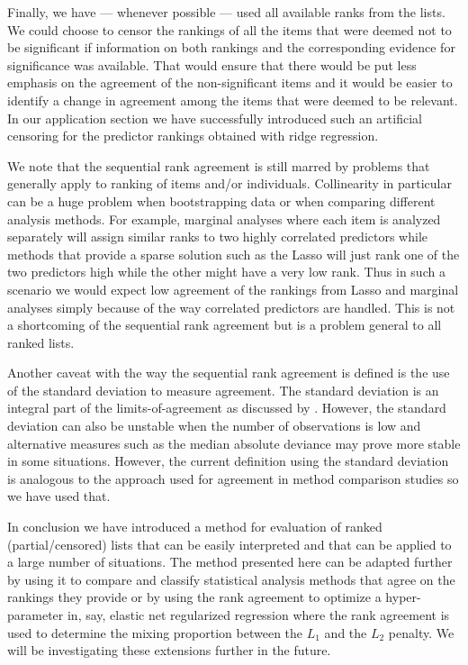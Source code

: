 \documentclass[12pt,a4paper]{article}
\theoremstyle{plain}
\begin{document}
Finally, we have --- whenever possible --- used all available ranks
from the lists.  We could choose to censor the rankings of all the
items that were deemed not to be significant if information on both
rankings and the corresponding evidence for significance was
available. That would ensure that there would be put less emphasis on
the agreement of the non-significant items and it would be easier to
identify a change in agreement among the items that were deemed to
be relevant. In our application section we have successfully introduced
such an artificial censoring for the predictor rankings obtained with
ridge regression.

We note that the sequential rank agreement is still marred by problems
that generally apply to ranking of items and/or
individuals. Collinearity in particular can be a huge problem when
bootstrapping data or when comparing different analysis methods. For
example, marginal analyses where each item is analyzed separately will
assign similar ranks to two highly correlated predictors while methods
that provide a sparse solution such as the Lasso will just rank one of
the two predictors high while the other might have a very low rank.
Thus in such a scenario we would expect low agreement of the rankings
from Lasso and marginal analyses simply because of the way correlated
predictors are handled. This is not a shortcoming of the sequential
rank agreement but is a problem general to all ranked lists.

Another caveat with the way the sequential rank agreement is defined
is the use of the standard deviation to measure agreement. The
standard deviation is an integral part of the limits-of-agreement as
discussed by \citet{alt:bland:1983}. However, the standard deviation
can also be unstable when the number of observations is low and
alternative measures such as the median absolute deviance may prove more
stable in some situations. However, the current definition using the
standard deviation is analogous to the approach used for agreement in
method comparison studies so we have used that.

In conclusion we have introduced a method for evaluation of ranked
(partial/censored) lists that can be easily interpreted and that can be
applied to a large number of situations.  The method presented here
can be adapted further by using it to compare and classify statistical
analysis methods that agree on the rankings they provide or by using
the rank agreement to optimize a hyper-parameter in, say, elastic net
regularized regression where the rank agreement is used to determine
the mixing proportion between the $L_1$ and the $L_2$ penalty.
We will be investigating these extensions further in the future.
\end{document}
